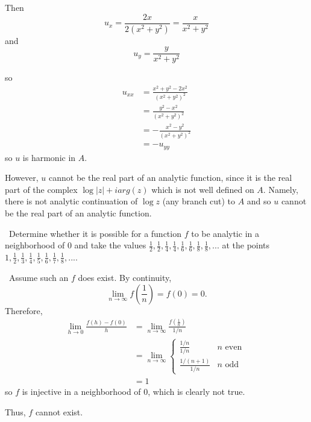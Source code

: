 \documentclass[12pt]{Homework}
\begin{document}
\begin{solution}
\begin{enumerate}[label=(\alph*)]
    Then $$u_x=\frac{2x}{2(x^2+y^2)}=\frac{x}{x^2+y^2}$$ and $$u_y=\frac{y}{x^2+y^2}$$
    
    so \begin{align*}
        u_{xx}&=\frac{x^2+y^2-2x^2}{(x^2+y^2)^2}\\
        &=\frac{y^2-x^2}{(x^2+y^2)^2}\\
        &=-\frac{x^2-y^2}{(x^2+y^2)^2}\\
        &=-u_{yy}
    \end{align*} so $u$ is harmonic in $A$.
    
    However, $u$ cannot be the real part of an analytic function, since it is the real part of the complex $\log|z|+iarg(z)$ which is not well defined on $A$. Namely, there is not analytic continuation of $\log z$ (any branch cut) to $A$ and so $u$ cannot be the real part of an analytic function.
\end{enumerate}
\end{solution}
\newpage





\begin{problem} $\,$
Determine whether it is possible for a function $f$ to be analytic in a neighborhood of $0$ and take the values $\frac{1}{2},\frac{1}{2},\frac{1}{4},\frac{1}{4},\frac{1}{6},\frac{1}{6},\frac{1}{8},\frac{1}{8},...$ at the points $1,\frac{1}{2},\frac{1}{3},\frac{1}{4},\frac{1}{5},\frac{1}{6},\frac{1}{7},\frac{1}{8},...$.
\end{problem}


\begin{solution}$\,$
Assume such an $f$ does exist. By continuity, $$\lim_{n\to\infty}f\left(\frac{1}{n}\right)=f(0)=0.$$ Therefore, \begin{align*}
    \lim_{h\to0}\frac{f(h)-f(0)}{h}&=\lim_{n\to\infty}\frac{f\left(\frac{1}{n}\right)}{1/n}\\
    &=\lim_{n\to\infty}\begin{cases}
\frac{1/n}{1/n} & n\text{ even }\\
\frac{1/(n+1)}{1/n} & n\text{ odd }
\end{cases}\\
&=1
\end{align*} so  $f$ is injective in a neighborhood of $0$, which is clearly not true.

Thus, $f$ cannot exist.
\end{solution}
\end{document}
